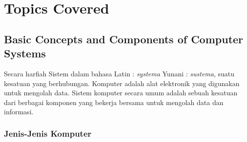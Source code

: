 \documentclass[12pt]{article}
\begin{document}
\section{Topics Covered}

\subsection{Basic Concepts and Components of Computer Systems}
Secara harfiah Sistem dalam bahasa Latin : \textit{systema} Yunani : \textit{sustema}, suatu kesatuan yang berhubungan. Komputer adalah alat elektronik yang digunakan untuk mengolah data. Sistem komputer secara umum adalah sebuah kesatuan dari berbagai komponen yang bekerja bersama untuk mengolah data dan informasi. 

\subsubsection{ Jenis-Jenis Komputer } 
\end{document}
